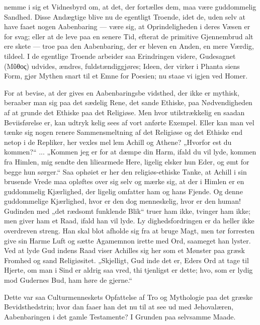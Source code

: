 \documentclass[12pt]{book}
\newcommand{\opage}[1]{\marginnote{\footnotesize\textit{[#1]}}}
\begin{document}
nemme i sig et Vidnesbyrd om, at det, der fortælles dem,
maa være guddommelig Sandhed. Disse Andægtige blive
nu de egentligt Troende, idet de, uden selv at have faaet
nogen Aabenbaring --- være sig, at Oprindeligheden i
deres Væsen er for svag; eller at de leve paa en senere
Tid, efterat de primitive Gjennembrud alt ere skete ---
troe paa den Aabenbaring, der er bleven en Anden, en
mere Værdig, tildeel. I de egentlige Troende arbeider
saa Erindringen videre, Gudesagnet (Μῦθος) udvides, %
ændres, fuldstændiggjøres; Ideen, der virker i Phanta\-%
siens Form, gjør Mythen snart til et Emne for Poesien;
nu staae vi igjen ved Homer.

For at bevise, at der gives en Aabenbaringsbe\-%
\opage{95}\setcounter{footnote}{0}%
vidsthed, der ikke er mythisk, beraaber man sig paa det
sædelig Rene, det sande Ethiske, paa Nødvendigheden
af at grunde det Ethiske paa det Religiøse. Men hvor
utilstrækkelig en saadan Beviisførelse er, kan udtryk\-%
kelig sees af vort anførte Exempel. Eller kan man vel
tænke sig nogen renere Sammensmeltning af det Religiøse
og det Ethiske end netop i de Repliker, her vexles mel\-%
lem Achill og Athene? „Hvorfor est du kommen?“ ...
„Kommen jeg er for at dæmpe din Harm, ifald du vil
lyde, kommen fra Himlen, mig sendte den liliearmede
Here, ligelig elsker hun Eder, og ømt for begge hun
sørger.“ Saa ophøiet er her den religiøs-ethiske Tanke,
at Achill i sin brusende Vrede maa opløftes over sig
selv og mærke sig, at der i Himlen er en guddommelig
Kjærlighed, der ligelig omfatter ham og hans Fjende.
Og denne guddommelige Kjærlighed, hvor er den dog
menneskelig, hvor er den human! Gudinden med „det
rædsomt funklende Blik“ truer ham ikke, tvinger ham
ikke; men giver ham et Raad, ifald han vil lyde. Ly\-%
dighedsfordringen er da heller ikke overdreven streng.
Han skal blot afholde sig fra at bruge Magt, men tør
forresten give sin Harme Luft og sætte Agamemnon
irette med Ord, saameget han lyster. Ved at lyde Gud\-%
indens Raad viser Achilles sig her som et Mønster paa
græsk Fromhed og sand Religiøsitet. „Skjelligt, Gud\-%
inde det er, Eders Ord at tage til Hjerte, om man i
Sind er aldrig saa vred, thi tjenligst er dette; hvo,
som er lydig mod Gudernes Bud, ham høre de gjerne.“

Dette var saa Culturmenneskets Opfattelse af Tro
og Mythologie paa det græske Bevidsthedstrin; hvor\-%
dan faaer han det nu til at see ud med Jehovalæren,
Aabenbaringen i det gamle Testamente? I Grunden paa
selvsamme Maade.
\end{document}
